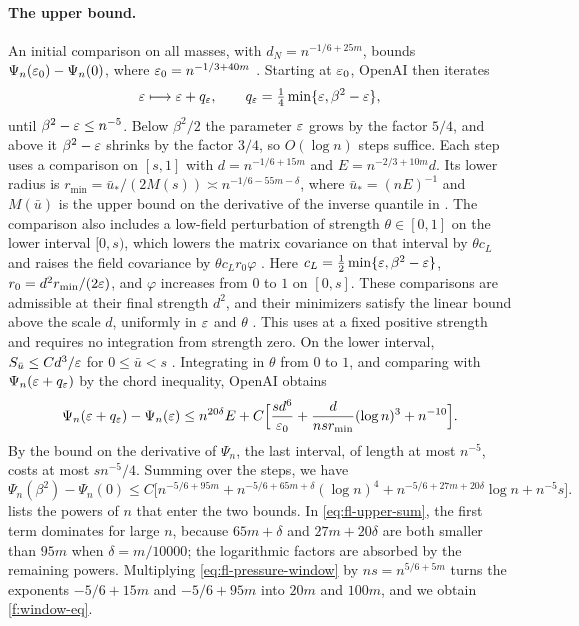 \paragraph{The upper bound.} An initial comparison on all masses, with $d_N=n^{-1/6+25m}$, bounds $\Psi_n(\varepsilon_0)-\Psi_n(0)$, where $\varepsilon_0=n^{-1/3+40m}$ \cite[Section~7.2]{oai-fluctuations}. Starting at $\varepsilon_0$, OpenAI then iterates
\[
 \varepsilon\longmapsto\varepsilon+q_\varepsilon,\qquad q_\varepsilon=\tfrac14\min\{\varepsilon,\beta^2-\varepsilon\},
\]
until $\beta^2-\varepsilon\le n^{-5}$. Below $\beta^2/2$ the parameter $\varepsilon$ grows by the factor $5/4$, and above it $\beta^2-\varepsilon$ shrinks by the factor $3/4$, so $O(\log n)$ steps suffice. Each step uses a comparison on $[s,1]$ with $d=n^{-1/6+15m}$ and $E=n^{-2/3+10m}d$. Its lower radius is $r_{\min}={\bar u}_*/(2M(s))\asymp n^{-1/6-55m-\delta}$, where ${\bar u}_*=(nE)^{-1}$ and $M({\bar u})$ is the upper bound on the derivative of the inverse quantile in \cite[(5)]{oai-fluctuations}. The comparison also includes a low-field perturbation of strength $\theta\in[0,1]$ on the lower interval $[0,s)$, which lowers the matrix covariance on that interval by $\theta c_L$ and raises the field covariance by $\theta c_Lr_0\varphi$ \cite[Section~7.3]{oai-fluctuations}. Here $c_L=\frac12\min\{\varepsilon,\beta^2-\varepsilon\}$, $r_0=d^2r_{\min}/(2\varepsilon)$, and $\varphi$ increases from $0$ to $1$ on $[0,s]$. These comparisons are admissible at their final strength $d^2$, and their minimizers satisfy the linear bound above the scale $d$, uniformly in $\varepsilon$ and $\theta$ \cite[Lemma~7.2]{oai-fluctuations}. This uses \cite[Corollary~6.7]{oai-fluctuations} at a fixed positive strength and requires no integration from strength zero. On the lower interval, $S_{\bar u}\le Cd^3/\varepsilon$ for $0\le {\bar u}<s$ \cite[Lemma~7.3]{oai-fluctuations}. Integrating in $\theta$ from $0$ to $1$, and comparing with $\Psi_n(\varepsilon+q_\varepsilon)$ by the chord inequality, OpenAI obtains \cite[Lemma~7.4]{oai-fluctuations}
\[
 \Psi_n(\varepsilon+q_\varepsilon)-\Psi_n(\varepsilon)\le n^{20\delta}E
 +C\Bigl[\frac{sd^6}{\varepsilon_0}+\frac{d}{nsr_{\min}}(\log n)^3+n^{-10}\Bigr].
\]
By the bound on the derivative of $\Psi_n$, the last interval, of length at most $n^{-5}$, costs at most $sn^{-5}/4$. Summing over the steps, we have \cite[Section~7.4]{oai-fluctuations}
\begin{equation}\label{eq:fl-upper-sum}
 \Psi_n(\beta^2)-\Psi_n(0)\le C\bigl[n^{-5/6+95m}+n^{-5/6+65m+\delta}(\log n)^4
 +n^{-5/6+27m+20\delta}\log n+n^{-5}s\bigr].
\end{equation}
 lists the powers of $n$ that enter the two bounds. In \eqref{eq:fl-upper-sum}, the first term dominates for large $n$, because $65m+\delta$ and $27m+20\delta$ are both smaller than $95m$ when $\delta=m/10000$; the logarithmic factors are absorbed by the remaining powers. Multiplying \eqref{eq:fl-pressure-window} by $ns=n^{5/6+5m}$ turns the exponents $-5/6+15m$ and $-5/6+95m$ into $20m$ and $100m$, and we obtain \eqref{f:window-eq}.

